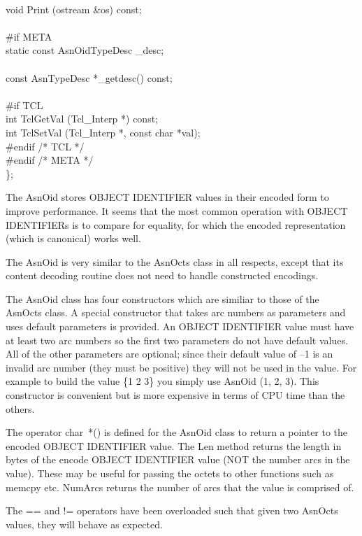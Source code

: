 \begin{Ccode}
\\
  void				\>\>Print (ostream \&os) const;\\
\\
\<\#if META\\
  static const AsnOidTypeDesc	\>\>\_desc;\\
\\
  const AsnTypeDesc		\>\>*\_getdesc() const;\\
\\
\<\#if TCL\\
  int				\>\>TclGetVal (Tcl\_Interp *) const;\\
  int				\>\>TclSetVal (Tcl\_Interp *, const char *val);\-\\
\#endif /* TCL */\\
\#endif /* META */\\
\};
\end{Ccode}

The {\C AsnOid} stores OBJECT IDENTIFIER values in their encoded form
to improve performance.  It seems that the most common operation with
OBJECT IDENTIFIERs is to compare for equality, for which the encoded
representation (which is canonical) works well.

The {\C AsnOid} is very similar to the {\C AsnOcts} class in all
respects, except that its content decoding routine does not need to
handle constructed encodings.

The {\C AsnOid} class has four constructors which are similiar to
those of the {\C AsnOcts} class.  A special constructor that takes
arc numbers as parameters and uses default parameters is provided.  An
OBJECT IDENTIFIER value must have at least two arc numbers so the
first two parameters do not have default values.  All of the other
parameters are optional; since their default value of {\C --1} is an
invalid arc number (they must be positive) they will not be used in the
value. For example to build the value {\C \{1 2 3\}} you simply use
{\C AsnOid (1, 2, 3)}.  This constructor is convenient but is more
expensive in terms of CPU time than the others.

The {\C operator char~*()} is defined for the {\C AsnOid} class to
return a pointer to the encoded OBJECT IDENTIFIER value.  The {\C Len}
method returns the length in bytes of the encode OBJECT IDENTIFIER
value (NOT the number arcs in the value).  These may be useful for
passing the octets to other functions such as {\C memcpy} etc.
{\C NumArcs} returns the number of arcs that the value is comprised of.

The {\C ==} and {\C !=} operators have been overloaded such that
given two {\C AsnOcts} values, they will behave as expected.



